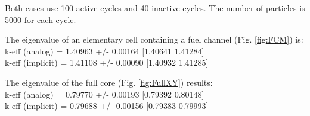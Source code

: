 Both cases use 100 active cycles and 40 inactive cycles. The number of particles is 5000 for each cycle.

The eigenvalue of an elementary cell containing a fuel channel (Fig. \ref{fig:FCM}) is: \\
\noindent
k-eff (analog)    = 1.40963 +/- 0.00164  [1.40641  1.41284]\\
\noindent
k-eff (implicit)  = 1.41108 +/- 0.00090  [1.40932  1.41285]

The eigenvalue of the full core (Fig. \ref{fig:FullXY}) results:\\
\noindent
k-eff (analog)    = 0.79770 +/- 0.00193  [0.79392  0.80148]\\
\noindent
k-eff (implicit)  = 0.79688 +/- 0.00156  [0.79383  0.79993]